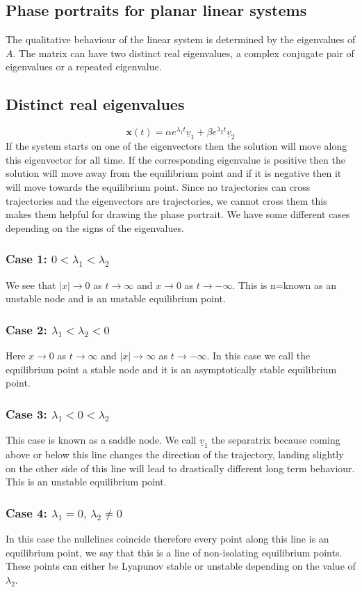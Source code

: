 \documentclass[12pt]{article}
\begin{document}
\subsection*{Phase portraits for planar linear systems}
The qualitative behaviour of the linear system is determined by the eigenvalues of \(A\). The matrix can have two distinct real eigenvalues, a complex conjugate pair of eigenvalues or a repeated eigenvalue.
\subsection*{Distinct real eigenvalues}
\[\textbf{x}(t)=\alpha e^{\lambda_1t}\underline{v}_1+\beta e^{\lambda_2t}\underline{v}_2\]
If the system starts on one of the eigenvectors then the solution will move along this eigenvector for all time. If the corresponding eigenvalue is positive then the solution will move away from the equilibrium point and if it is negative then it will move towards the equilibrium point. Since no trajectories can cross trajectories and the eigenvectors are trajectories, we cannot cross them this makes them helpful for drawing the phase portrait. We have some different cases depending on the signs of the eigenvalues.
\subsubsection*{Case 1: \(0<\lambda_1<\lambda_2\)}
We see that \(|x|\to0\) as \(t\to\infty\) and \(x\to0\) as \(t\to-\infty\). This is n=known as an unstable node and is an unstable equilibrium point.
\subsubsection*{Case 2: \(\lambda_1<\lambda_2<0\)}
Here \(x\to0\) as \(t\to\infty\) and \(|x|\to\infty\) as \(t\to-\infty\). In this case we call the equilibrium point a stable node and it is an asymptotically stable equilibrium point.
\subsubsection*{Case 3: \(\lambda_1<0<\lambda_2\)}
This case is known as a saddle node. We call \(\underline{v}_1\) the separatrix because coming above or below this line changes the direction of the trajectory, landing slightly on the other side of this line will lead to drastically different long term behaviour. This is an unstable equilibrium point.
\subsubsection*{Case 4: \(\lambda_1=0,\,\lambda_2\ne0\)}
In this case the nullclines coincide therefore every point along this line is an equilibrium point, we say that this is a line of non-isolating equilibrium points. These points can either be Lyapunov stable or unstable depending on the value of \(\lambda_2\).
\end{document}
